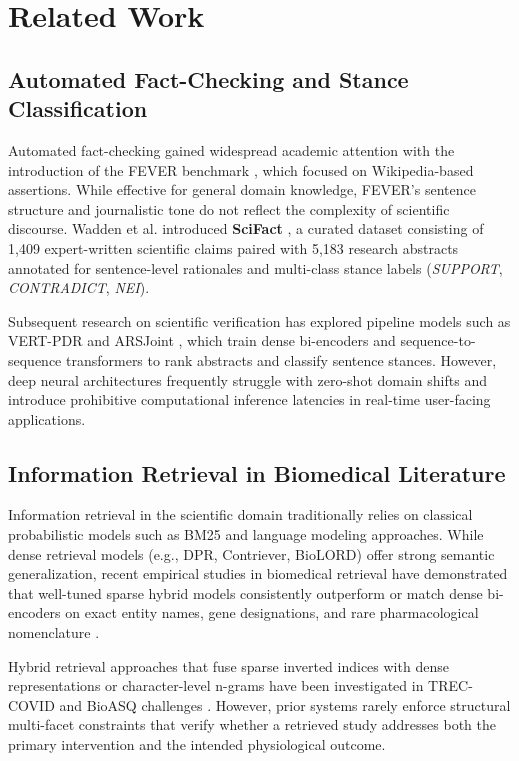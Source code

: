 \documentclass[conference]{IEEEtran}
\begin{document}
\section{Related Work}

\subsection{Automated Fact-Checking and Stance Classification}
Automated fact-checking gained widespread academic attention with the introduction of the FEVER benchmark \cite{thorne2018fever}, which focused on Wikipedia-based assertions. While effective for general domain knowledge, FEVER's sentence structure and journalistic tone do not reflect the complexity of scientific discourse. Wadden et al. introduced \textbf{SciFact} \cite{wadden2020scifact}, a curated dataset consisting of 1,409 expert-written scientific claims paired with 5,183 research abstracts annotated for sentence-level rationales and multi-class stance labels (\textit{SUPPORT}, \textit{CONTRADICT}, \textit{NEI}).

Subsequent research on scientific verification has explored pipeline models such as VERT-PDR \cite{pradeep2021scientific} and ARSJoint \cite{zhang2021scientific}, which train dense bi-encoders and sequence-to-sequence transformers to rank abstracts and classify sentence stances. However, deep neural architectures frequently struggle with zero-shot domain shifts and introduce prohibitive computational inference latencies in real-time user-facing applications.

\subsection{Information Retrieval in Biomedical Literature}
Information retrieval in the scientific domain traditionally relies on classical probabilistic models such as BM25 \cite{robertson2009probabilistic} and language modeling approaches. While dense retrieval models (e.g., DPR, Contriever, BioLORD) offer strong semantic generalization, recent empirical studies in biomedical retrieval have demonstrated that well-tuned sparse hybrid models consistently outperform or match dense bi-encoders on exact entity names, gene designations, and rare pharmacological nomenclature \cite{thakur2021beir,karpukhin2020dense}. 

Hybrid retrieval approaches that fuse sparse inverted indices with dense representations or character-level n-grams have been investigated in TREC-COVID and BioASQ challenges \cite{voorhees2021trec,tsatsaronis2015overview}. However, prior systems rarely enforce structural multi-facet constraints that verify whether a retrieved study addresses both the primary intervention and the intended physiological outcome.
\end{document}
